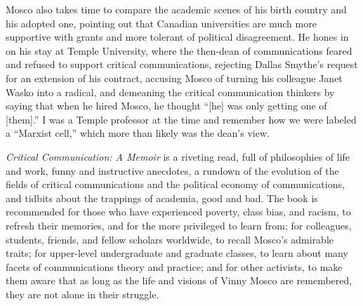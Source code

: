 \documentclass{tufte-handout}
\begin{document}
Mosco also takes time to compare the academic scenes of his birth
country and his adopted one, pointing out that Canadian universities are
much more supportive with grants and more tolerant of political
disagreement. He hones in on his stay at Temple University, where the
then-dean of communications feared and refused to support critical
communications, rejecting Dallas Smythe's request for an extension of
his contract, accusing Mosco of turning his colleague Janet Wasko into a
radical, and demeaning the critical communication thinkers by saying
that when he hired Mosco, he thought ``{[}he{]} was only getting one of
{[}them{]}.'' I was a Temple professor at the time and remember how we
were labeled a ``Marxist cell,'' which more than likely was the dean's
view.

\emph{Critical Communication: A Memoir} is a riveting read, full of
philosophies of life and work, funny and instructive anecdotes, a
rundown of the evolution of the fields of critical communications and
the political economy of communications, and tidbits about the trappings
of academia, good and bad. The book is recommended for those who have
experienced poverty, class bias, and racism, to refresh their memories,
and for the more privileged to learn from; for colleagues, students,
friends, and fellow scholars worldwide, to recall Mosco's admirable
traits; for upper-level undergraduate and graduate classes, to learn
about many facets of communications theory and practice; and for other
activists, to make them aware that as long as the life and visions of
Vinny Mosco are remembered, they are not alone in their struggle.

\enlargethispage{2\baselineskip}
\end{document}
